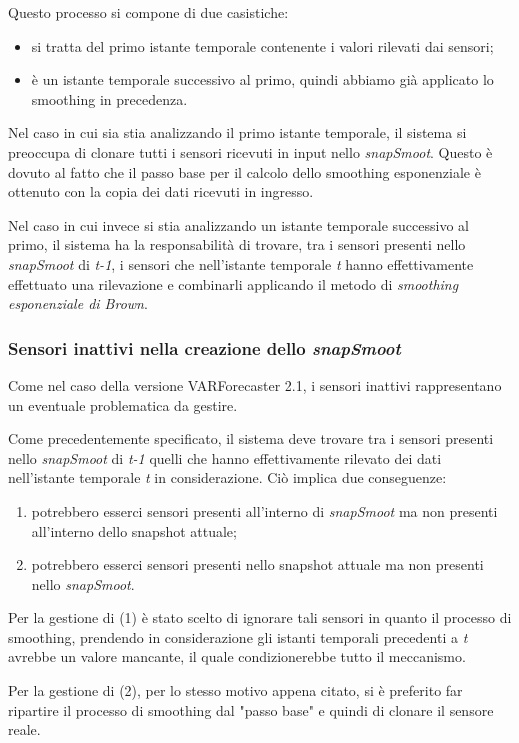 \documentclass[12pt,a4paper,oneside,openright]{book}
\begin{document}
Questo processo si compone di due casistiche:
\begin{itemize}
\item si tratta del primo istante temporale contenente i valori rilevati dai sensori;
\item è un istante temporale successivo al primo, quindi abbiamo già applicato lo smoothing in precedenza.
\end{itemize}

Nel caso in cui sia stia analizzando il primo istante temporale, il sistema si preoccupa di clonare tutti i sensori ricevuti in input nello \textit{snapSmoot}. Questo è dovuto al fatto che il passo base per il calcolo dello smoothing esponenziale è ottenuto con la copia dei dati ricevuti in ingresso. 

Nel caso in cui invece si stia analizzando un istante temporale successivo al primo, il sistema ha la responsabilità di trovare, tra i sensori presenti nello \textit{snapSmoot} di \textit{t-1}, i sensori che nell'istante temporale \textit{t} hanno effettivamente effettuato una rilevazione e combinarli applicando il metodo di \textit{smoothing esponenziale di Brown}.

\subsubsection{Sensori inattivi nella creazione dello \textit{snapSmoot}}
Come nel caso della versione VARForecaster 2.1, i sensori inattivi rappresentano un eventuale problematica da gestire. 

Come precedentemente specificato, il sistema deve trovare tra i sensori presenti nello \textit{snapSmoot} di \textit{t-1} quelli che hanno effettivamente rilevato dei dati nell'istante temporale \textit{t} in considerazione. Ciò implica due conseguenze: 
\begin{enumerate}
\item potrebbero esserci sensori presenti all'interno di \textit{snapSmoot} ma non presenti all'interno dello snapshot attuale;
\item potrebbero esserci sensori presenti nello snapshot attuale ma non presenti nello \textit{snapSmoot}.
\end{enumerate}
Per la gestione di (1) è stato scelto di ignorare tali sensori in quanto il processo di smoothing, prendendo in considerazione gli istanti temporali precedenti a \textit{t} avrebbe un valore mancante, il quale condizionerebbe tutto il meccanismo.

Per la gestione di (2), per lo stesso motivo appena citato, si è preferito far ripartire il processo di smoothing dal "passo base" e quindi di clonare il sensore reale.
\end{document}
